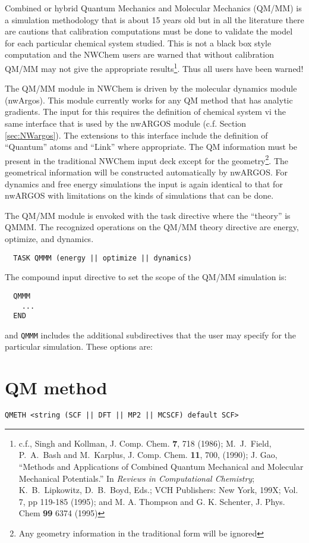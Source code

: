 
\label{sec:qmmm}

Combined or hybrid Quantum Mechanics and Molecular Mechanics (QM/MM)
is a simulation methodology that is about 15 years old but in all the
literature there are cautions that calibration computations must be
done to validate the model for each particular chemical system
studied.  This is not a black box style computation and the NWChem
users are warned that without calibration QM/MM may not give the
appropriate results\footnote{c.f., Singh and Kollman, J. Comp. Chem.
  {\bf 7}, 718 (1986); M.~J.~Field, P.~A.~Bash and M.~Karplus, J.
  Comp. Chem. {\bf 11}, 700, (1990); J. Gao, ``Methods and
  Applications of Combined Quantum Mechanical and Molecular Mechanical
  Potentials.'' In {\it Reviews in Computational Chemistry};
  K.~B.~Lipkowitz, D.~B.~Boyd, Eds.; VCH Publishers: New York, 199X;
  Vol. 7, pp 119-185 (1995); and M. A. Thompson and G. K. Schenter, J.
  Phys. Chem {\bf 99} 6374 (1995) }.  Thus all users have been warned!

The QM/MM module in NWChem is driven by the molecular dynamics module
(nwArgos).  This module currently works for any QM method that has
analytic gradients.  The input for this requires the definition of
chemical system vi the same interface that is used by the nwARGOS
module (c.f. Section \ref{sec:NWargos}).  The extensions to this
interface include the definition of ``Quantum'' atoms and ``Link''
where appropriate.  The QM information must be present in the
traditional NWChem input deck except for the geometry\footnote{Any
  geometry information in the traditional form will be ignored}.  The
geometrical information will be constructed automatically by nwARGOS.
For dynamics and free energy simulations the input is again identical
to that for nwARGOS with limitations on the kinds of simulations that
can be done.

The QM/MM module is envoked with the task directive where the
``theory'' is QMMM.  The recognized operations on the QM/MM theory
directive are energy, optimize, and dynamics.

\begin{verbatim}
  TASK QMMM (energy || optimize || dynamics)
\end{verbatim}

The compound input directive to set the scope of the QM/MM simulation
is: 
\begin{verbatim}
  QMMM
    ...
  END
\end{verbatim}

and \verb+QMMM+ includes the additional subdirectives that the user
may specify for the particular simulation.  These options are:

\section{QM method}
\begin{verbatim}
QMETH <string (SCF || DFT || MP2 || MCSCF) default SCF>
\end{verbatim}




